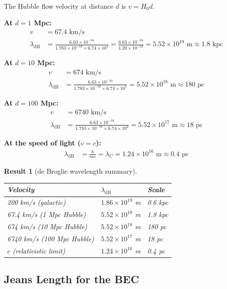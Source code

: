 \documentclass[11pt,a4paper]{article}
\newcommand{\ee}[1]{\times 10^{#1}}
\newcommand{\lambdadB}{\ensuremath{\lambda_{\mathrm{dB}}}}
\newtheorem{result}{Result}
\begin{document}
The Hubble flow velocity at distance $d$ is $v = H_0 d$.

\textbf{At $d = 1$ Mpc:}
\begin{align}
v &= 67.4 \text{ km/s} \\
\lambdadB &= \frac{6.63 \ee{-34}}{1.783 \ee{-58} \times 6.74 \ee{4}} = \frac{6.63 \ee{-34}}{1.20 \ee{-53}} = 5.52 \ee{19} \text{ m} \approx 1.8 \text{ kpc}
\end{align}

\textbf{At $d = 10$ Mpc:}
\begin{align}
v &= 674 \text{ km/s} \\
\lambdadB &= \frac{6.63 \ee{-34}}{1.783 \ee{-58} \times 6.74 \ee{5}} = 5.52 \ee{18} \text{ m} \approx 180 \text{ pc}
\end{align}

\textbf{At $d = 100$ Mpc:}
\begin{align}
v &= 6740 \text{ km/s} \\
\lambdadB &= \frac{6.63 \ee{-34}}{1.783 \ee{-58} \times 6.74 \ee{6}} = 5.52 \ee{17} \text{ m} \approx 18 \text{ pc}
\end{align}

\textbf{At the speed of light ($v = c$):}
\begin{align}
\lambdadB &= \frac{h}{mc} = \lambda_C = 1.24 \ee{16} \text{ m} \approx 0.4 \text{ pc}
\end{align}

\begin{result}[de Broglie wavelength summary]
\begin{center}
\begin{tabular}{lll}
\toprule
\textbf{Velocity} & \textbf{$\lambdadB$} & \textbf{Scale} \\
\midrule
200 km/s (galactic) & $1.86 \ee{19}$ m & 0.6 kpc \\
67.4 km/s (1 Mpc Hubble) & $5.52 \ee{19}$ m & 1.8 kpc \\
674 km/s (10 Mpc Hubble) & $5.52 \ee{18}$ m & 180 pc \\
6740 km/s (100 Mpc Hubble) & $5.52 \ee{17}$ m & 18 pc \\
$c$ (relativistic limit) & $1.24 \ee{16}$ m & 0.4 pc \\
\bottomrule
\end{tabular}
\end{center}
\end{result}

\subsection{Jeans Length for the BEC}
\end{document}
